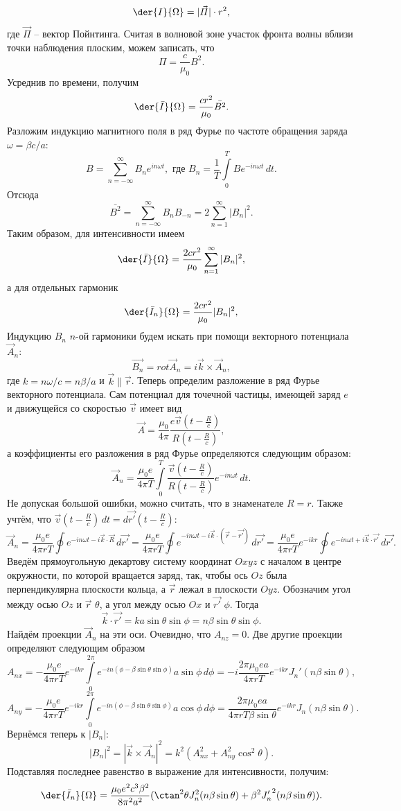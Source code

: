 \[
    \der{I}{\Omega} = |\vec{\varPi}|\cdot r^2,
\]
где \( \vec{\varPi} \) -- вектор Пойнтинга. Считая в волновой зоне участок 
фронта волны вблизи точки наблюдения плоским, можем записать, что
\[
    \varPi = \frac{c}{\mu_0}B^2.
\]
Усреднив по времени, получим
\[
    \der{\bar{I}}{\Omega} = \frac{cr^2}{\mu_0}\bar{B^2}.
\]
Разложим индукцию магнитного поля в ряд Фурье по частоте обращения заряда \( \omega = \beta c/a \):
\[
    B = \sum_{n=-\infty}^{\infty}B_n e^{in\omega t},\text{ где }
    B_n = \frac{1}{T}\int\limits_0^T Be^{-in\omega t}\,dt.
\]
Отсюда
\[
    \bar{B^2} = \sum_{n=-\infty}^{\infty}B_nB_{-n} = 2\sum_{n=1}^\infty |B_n|^2.
\]
Таким образом, для интенсивности имеем
\[
    \der{\bar{I}}{\Omega} = \frac{2cr^2}{\mu_0}\sum_{n=1}^\infty |B_n|^2,
\]
а для отдельных гармоник
\[
    \der{\bar{I}_n}{\Omega} = \frac{2cr^2}{\mu_0}|B_n|^2,
\]
Индукцию \( B_n \) \( n \)-ой гармоники будем искать при помощи векторного потенциала \( \vec{A}_n \):
\[
    \vec{B_n} = rot\vec{A}_n = i\vec{k}\times\vec{A}_n,
\]
где \( k = n\omega/c = n\beta/a \) и \( \vec{k}\parallel\vec{r} \).
Теперь определим разложение в ряд Фурье векторного потенциала. Сам потенциал для точечной частицы, имеющей заряд \( e \) и движущейся со скоростью \( \vec{v} \) имеет вид
\[
    \vec{A} = \frac{\mu_0}{4\pi}\frac{e\vec{v}(t-\frac{R}{c})}{R(t-\frac{R}{c})},
\]
а коэффициенты его разложения в ряд Фурье определяются следующим образом:
\[
    \vec{A}_n = \frac{\mu_0 e}{4\pi T}\int\limits_0^T \frac{\vec{v}(t-\frac{R}{c})}{R(t-\frac{R}{c})}e^{-in\omega t}\,dt.
\]
Не допуская большой ошибки, можно считать, что в знаменателе \( R = r \). Также
учтём, что \( \vec{v}(t-\frac{R}{c})\,dt = d\vec{r'}(t-\frac{R}{c}) \):
\[
    \vec{A}_n = \frac{\mu_0 e}{4\pi rT}\oint e^{-in\omega t - i\vec{k}\cdot\vec{R}}\,d\vec{r'} = \frac{\mu_0 e}{4\pi rT}\oint e^{-in\omega t - i\vec{k}\cdot(\vec{r} - \vec{r'})}\,d\vec{r'} = \frac{\mu_0 e}{4\pi rT}e^{-ikr}\oint e^{-in\omega t+i\vec{k}\cdot\vec{r'}}\,d\vec{r'}.
\]
Введём прямоугольную декартову систему координат \( Oxyz \) с началом в центре окружности, по которой вращается заряд, так, чтобы ось \( Oz \) была перпендикулярна плоскости кольца, а \( \vec{r} \) лежал в плоскости \( Oyz \). Обозначим угол между осью \( Oz \) и \( \vec{r} \) \( \theta \), а угол между осью \( Ox \) и \( \vec{r'} \) \( \phi \). Тогда
\[
    \vec{k}\cdot\vec{r'} = ka\sin\theta\sin\phi = n\beta\sin\theta\sin\phi.
\]
Найдём проекции \( \vec{A}_n \)  на эти оси. Очевидно, что \( A_{nz} = 0 \). Две другие проекции определяют следующим образом
\[
    A_{nx} = -\frac{\mu_0 e}{4\pi rT}e^{-ikr}\int\limits_0^{2\pi} e^{-in(\phi-\beta\sin\theta\sin\phi)}a\sin\phi\,d\phi = -i\frac{2\pi\mu_0 ea}{4\pi rT}e^{-ikr}J_n'(n\beta\sin\theta),
\]
\[
    A_{ny} = -\frac{\mu_0 e}{4\pi rT}e^{-ikr}\int\limits_0^{2\pi} e^{-in(\phi-\beta\sin\theta\sin\phi)}a\cos\phi\,d\phi = \frac{2\pi\mu_0 ea}{4\pi rT\beta\sin\theta}e^{-ikr}J_n(n\beta\sin\theta).
\]
Вернёмся теперь к \( |B_n| \):
\[
    |B_n|^2 = |\vec{k}\times\vec{A}_n|^2 = k^2(A_{nx}^2 + A_{ny}^2\cos^2\theta).
\]
Подставляя последнее равенство в выражение для интенсивности, получим:
\[
    \der{\bar{I}_n}{\Omega} = \frac{\mu_0e^2c^3\beta^2}{8\pi^2a^2}(\ctan^2\theta J_n^2(n\beta\sin\theta) + \beta^2 {J_n'}^2(n\beta\sin\theta)).
\]

